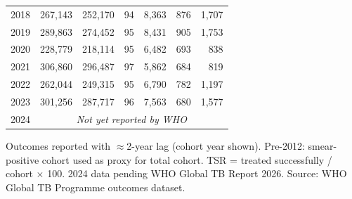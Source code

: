 \begin{table}[htbp]
\begin{tabular}{lrrrrrr}
2018 & 267,143 & 252,170 & 94 & 8,363 & 876 & 1,707 \\
2019 & 289,863 & 274,452 & 95 & 8,431 & 905 & 1,753 \\
2020 & 228,779 & 218,114 & 95 & 6,482 & 693 & 838 \\
2021 & 306,860 & 296,487 & 97 & 5,862 & 684 & 819 \\
2022 & 262,044 & 249,315 & 95 & 6,790 & 782 & 1,197 \\
2023 & 301,256 & 287,717 & 96 & 7,563 & 680 & 1,577 \\
2024 & \multicolumn{6}{c}{\textit{Not yet reported by WHO}} \\
\bottomrule
\end{tabular}
\par\smallskip
\raggedright\footnotesize Outcomes reported with $\approx$2-year lag (cohort year shown). Pre-2012: smear-positive cohort used as proxy for total cohort. TSR = treated successfully / cohort $\times$ 100. 2024 data pending WHO Global TB Report 2026. Source: WHO Global TB Programme outcomes dataset.
\end{table}